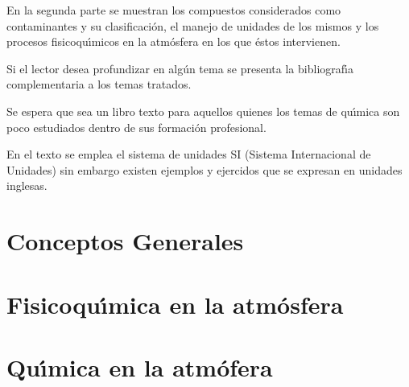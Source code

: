 \documentclass[spanish]{WileySix}
\begin{document}
\begin{preface}
 En la segunda parte se muestran los compuestos considerados como contaminantes y su clasificaci\'on, el manejo de unidades de los mismos y los procesos fisicoqu\'{\i}micos  en la atm\'osfera en los que \'estos intervienen.
 
 Si el lector desea profundizar en  alg\'un tema se presenta la bibliograf\'{\i}a complementaria a los temas tratados.
 
 Se espera que sea un libro texto para aquellos quienes los temas de qu\'{\i}mica son poco estudiados dentro de sus formaci\'on profesional.
 

En el texto se emplea el sistema de unidades SI (Sistema Internacional de Unidades)  sin embargo existen ejemplos y ejercidos que se expresan en unidades inglesas.
 \end{preface}
\renewcommand{\tablename}{Cuadro}

%
   \part{Conceptos Generales}





\part{Fisicoqu\'{\i}mica en la atm\'osfera}
  
   
    
\part{Qu\'{\i}mica en la atm\'ofera}
   
   
   
   
    \nocite{boyle1692general} \nocite{burton}\nocite{castellan}\nocite{Hein} 
    \nocite{maron}\nocite{reed2016acid}\nocite{wingrove}
%
\end{document}
